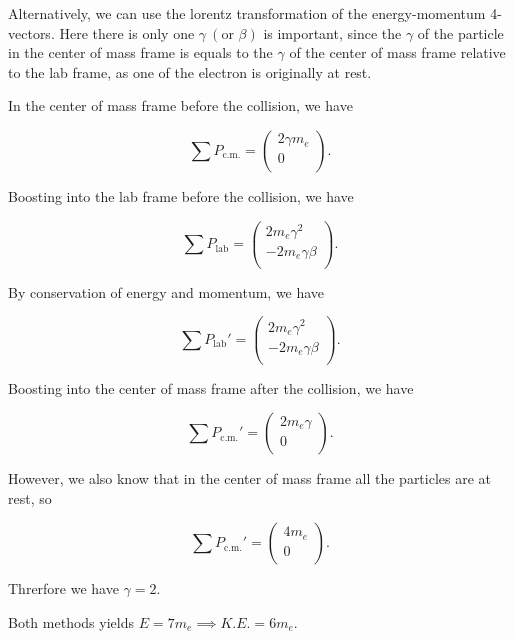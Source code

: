 \documentclass[english,a4paper,12pt]{report}
\begin{document}
{Alternatively, we can use the lorentz transformation of the energy-momentum 4-vectors. Here there is only one \(\gamma ~(\text {or } \beta )\) is important, since the \(\gamma \) of the particle in the center of mass frame is equals to the \(\gamma \) of the center of mass frame relative to the lab frame, as one of the electron is originally at rest.   

In the center of mass frame before the collision, we have 

\begin{equation}
    \sum P_{\text{c.m.} }  = \begin{pmatrix}
         2\gamma  m_{e}  \\
         0 \\
    \end{pmatrix}.
\end{equation}

Boosting into the lab frame before the collision, we have

\begin{equation}
    \sum P_{\text{lab} } = \begin{pmatrix}
         2 m_{e} \gamma^2   \\
         -2 m_{e} \gamma\beta  \\
    \end{pmatrix}.
\end{equation}

By conservation of energy and momentum, we have

\begin{equation}
    \sum P_{\text{lab}}' = \begin{pmatrix}
         2 m_{e} \gamma ^2 \\
         -2 m_{e} \gamma \beta  \\
    \end{pmatrix}. 
\end{equation}

Boosting into the center of mass frame after the collision, we have

\begin{equation}
    \sum P_{\text{c.m.} }' = \begin{pmatrix}
         2 m_{e} \gamma  \\
         0 \\
    \end{pmatrix}.
\end{equation}

However, we also know that in the center of mass frame all the particles are at rest, so 

\begin{equation}
    \sum P_{\text{c.m.} }' = \begin{pmatrix}
         4 m_{e}  \\
         0 \\
    \end{pmatrix}.
\end{equation}

Threrfore we have \(\gamma = 2\).

Both methods yields \(E = 7m_{e} \implies K.E. = 6m_{e} \). 
}
\end{document}
